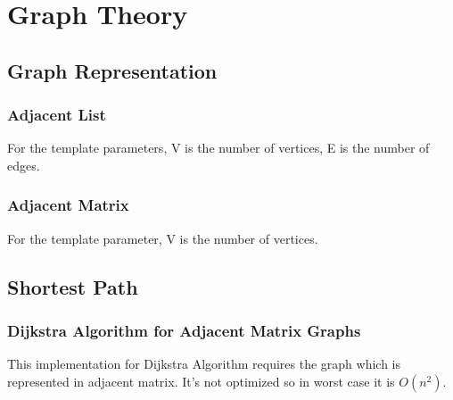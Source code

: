 \chapter{Graph Theory}


\section{Graph Representation}

\subsection{Adjacent List}

For the template parameters, V is the number of vertices, E is the number of
edges.



\subsection{Adjacent Matrix}

For the template parameter, V is the number of vertices.




\section{Shortest Path}

\subsection{Dijkstra Algorithm for Adjacent Matrix Graphs}

This implementation for Dijkstra Algorithm requires the graph which is
represented in adjacent matrix. It's not optimized so in worst case it is
$O(n^2)$.



